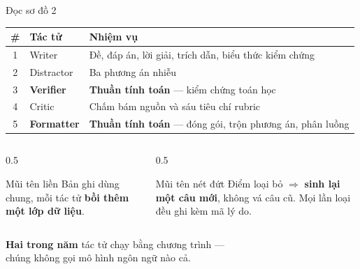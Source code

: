 \documentclass[aspectratio=169,11pt]{beamer}
\newcommand{\dt}[1]{\textcolor{cDet}{\textbf{#1}}}
\newcommand{\punch}[1]{\begin{center}\alert{\large #1}\end{center}}
\begin{document}
\begin{frame}{Đọc sơ đồ 2}
  \vspace{0.4em}
  \begin{center}
    \small
    \begin{tabular}{@{}c l l@{}}
      \toprule
      \# & \textbf{Tác tử} & \textbf{Nhiệm vụ} \\
      \midrule
      1 & Writer         & Đề, đáp án, lời giải, trích dẫn, biểu thức kiểm chứng \\
      2 & Distractor     & Ba phương án nhiễu \\
      3 & \dt{Verifier}  & \dt{Thuần tính toán} --- kiểm chứng toán học \\
      4 & Critic         & Chấm bám nguồn và sáu tiêu chí rubric \\
      5 & \dt{Formatter} & \dt{Thuần tính toán} --- đóng gói, trộn phương án, phân luồng \\
      \bottomrule
    \end{tabular}
  \end{center}
  \vfill
  \begin{columns}[T]
    \begin{column}{0.5\textwidth}
      \begin{block}{Mũi tên liền}
        Bản ghi dùng chung, mỗi tác tử \textbf{bồi thêm một lớp dữ liệu}.
      \end{block}
    \end{column}
    \begin{column}{0.5\textwidth}
      \begin{alertblock}{Mũi tên nét đứt}
        Điểm loại bỏ $\Rightarrow$ \textbf{sinh lại một câu mới}, không vá câu cũ. Mọi lần loại đều ghi kèm mã lý do.
      \end{alertblock}
    \end{column}
  \end{columns}
  \vfill
  \punch{\dt{Hai trong năm} tác tử chạy bằng chương trình ---\\[0.2em] chúng không gọi mô hình ngôn ngữ nào cả.}
  \vfill
\end{frame}
\end{document}
